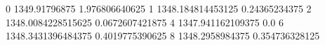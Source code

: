 0 1349.91796875 1.976806640625
1 1348.184814453125 0.24365234375
2 1348.0084228515625 0.0672607421875
4 1347.941162109375 0.0
6 1348.3431396484375 0.4019775390625
8 1348.2958984375 0.354736328125
